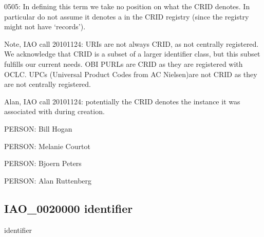 \documentclass[letterpaper,10pt,english]{sphinxmanual}
\begin{document}
\begin{sphinxShadowBox}

\sphinxhyphen{}05\sphinxhyphen{}05: In defining this term we take no position on what the CRID denotes. In particular do not assume it denotes a  in the CRID registry (since the registry might not have ‘records’).

\sphinxAtStartPar
Note, IAO call 20101124: URIs are not always CRID, as not centrally registered. We acknowledge that CRID is a subset of a larger identifier class, but this subset fulfills our current needs. OBI PURLs are CRID as they are registered with OCLC. UPCs (Universal Product Codes from AC Nielsen)are not CRID as they are not centrally registered.

\sphinxAtStartPar
Alan, IAO call 20101124: potentially the CRID denotes the instance it was associated with during creation.
\end{sphinxShadowBox}

\begin{sphinxShadowBox}

\sphinxAtStartPar
{}
\end{sphinxShadowBox}

\begin{sphinxShadowBox}

\sphinxAtStartPar
PERSON: Bill Hogan

\sphinxAtStartPar
PERSON: Melanie Courtot

\sphinxAtStartPar
PERSON: Bjoern Peters

\sphinxAtStartPar
PERSON: Alan Ruttenberg
\end{sphinxShadowBox}
\begin{quote}

\ignorespaces \end{quote}


\subsection{IAO\_0020000 \sphinxhyphen{} identifier}
\label{\detokenize{doc-IAO_0020000:iao-0020000-identifier}}\label{\detokenize{doc-IAO_0020000:index-0}}\label{\detokenize{doc-IAO_0020000::doc}}
\begin{sphinxShadowBox}

\sphinxAtStartPar
identifier
\end{sphinxShadowBox}
\end{document}
